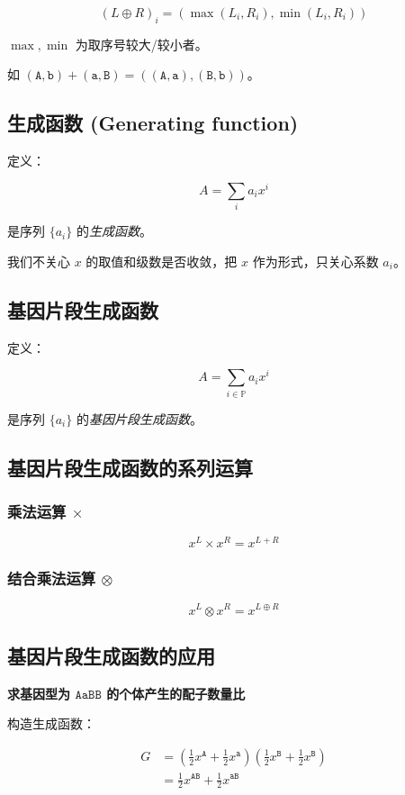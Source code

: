 \documentclass{article}
\begin{document}
$$(L \oplus R)_i=(\max(L_i,R_i),\min(L_i,R_i))$$

$\max,\min$ 为取序号较大/较小者。

如 $(\texttt{A},\texttt{b}) + (\texttt{a},\texttt{B})=((\texttt{A},\texttt{a}),(\texttt{B},\texttt{b}))$。

\subsection{生成函数 (Generating function)} 

定义：

$$A=\sum_{i} a_i x^{i}$$

是序列 $\{a_i\}$ 的\textsl{生成函数}。

我们不关心 $x$ 的取值和级数是否收敛，把 $x$ 作为形式，只关心系数 $a_i$。

\subsection{基因片段生成函数}

定义：

$$A=\sum_{i \in \mathbb{P}} a_i x^{i}$$

是序列 $\{a_i\}$ 的\textsl{基因片段生成函数}。

\subsection{基因片段生成函数的系列运算}

\subsubsection*{乘法运算 $\times$}

$$x^L \times x^R=x^{L+R}$$

\subsubsection*{结合乘法运算 $\otimes$}

$$x^L \otimes x^R=x^{L \oplus R}$$

\subsection{基因片段生成函数的应用}

\textbf{求基因型为 $\texttt{AaBB}$ 的个体产生的配子数量比}

构造生成函数：

$$\begin{aligned}
	G &= (\frac{1}{2} x^{\texttt{A}}+ \frac{1}{2}x^{\texttt{a}})(\frac{1}{2} x^{\texttt{B}}+ \frac{1}{2}x^{\texttt{B}}) \\
				&= \frac{1}{2} x^{\texttt{AB}} + \frac{1}{2} x^{\texttt{aB}}
\end{aligned}$$
\end{document}
